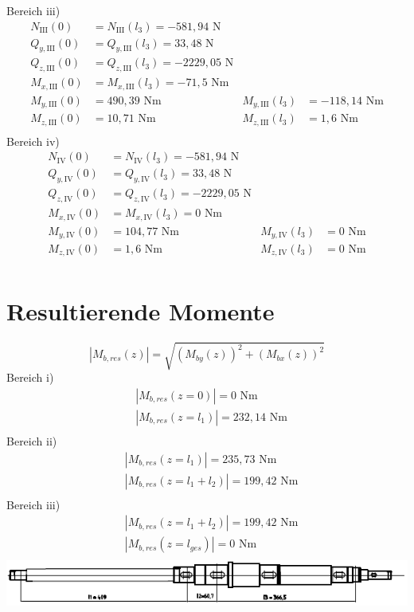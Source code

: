 Bereich iii)
\begin{align*}
	N_{\mathrm{III}} (0) &= N_{\mathrm{III}} (l_3) = -581,94 \text{ N}\\
	Q_{y,\mathrm{III}} (0) &= Q_{y,\mathrm{III}} (l_3) = 33,48\text{ N}\\
	Q_{z,\mathrm{III}} (0) &= Q_{z,\mathrm{III}} (l_3) = -2229,05\text{ N}\\
	M_{x,\mathrm{III}} (0) &= M_{x,\mathrm{III}} (l_3) = -71,5\text{ Nm}\\
	M_{y,\mathrm{III}} (0) &=  490,39\text{ Nm} & M_{y,\mathrm{III}} (l_3) &= -118,14\text{ Nm}\\
	M_{z,\mathrm{III}} (0) &= 10,71\text{ Nm} &M_{z,\mathrm{III}} (l_3) &= 1,6\text{ Nm}\\
\end{align*}
Bereich iv)
\begin{align*}
	N_{\mathrm{IV}} (0) &= N_{\mathrm{IV}} (l_3) = -581,94 \text{ N}\\
	Q_{y,\mathrm{IV}} (0) &= Q_{y,\mathrm{IV}} (l_3) = 33,48\text{ N}\\
	Q_{z,\mathrm{IV}} (0) &= Q_{z,\mathrm{IV}} (l_3) = -2229,05\text{ N}\\
	M_{x,\mathrm{IV}} (0) &= M_{x,\mathrm{IV}} (l_3) = 0\text{ Nm}\\
	M_{y,\mathrm{IV}} (0) &=  104,77\text{ Nm} & M_{y,\mathrm{IV}} (l_3) &= 0\text{ Nm}\\
	M_{z,\mathrm{IV}} (0) &= 1,6\text{ Nm} &M_{z,\mathrm{IV}} (l_3) &= 0\text{ Nm}\\
\end{align*}
\newpage
\section{Resultierende Momente}
\[
	|M_{b,res}(z)| = \sqrt{\left( M_{by}(z) \right)^2 + \left( M_{bx}(z) \right)^2 }
\]
Bereich i)
\begin{align*}
	&|M_{b,res}(z=0)| = 0 \text{ Nm} \\
	&|M_{b,res}(z=l_1)| = 232,14 \text{ Nm} \\
\end{align*}
Bereich ii)
\begin{align*}
	&|M_{b,res}(z=l_1)| = 235,73 \text{ Nm} \\
	&|M_{b,res}(z=l_1+l_2)| = 199,42 \text{ Nm} \\
\end{align*}
Bereich iii)
\begin{align*}
	&|M_{b,res}(z=l_1+l_2)| = 199,42 \text{ Nm} \\
	&|M_{b,res}(z=l_{ges})| = 0 \text{ Nm} \\
\end{align*}
\includegraphics[width=\textwidth,keepaspectratio]{figures/Welle1klein.png}